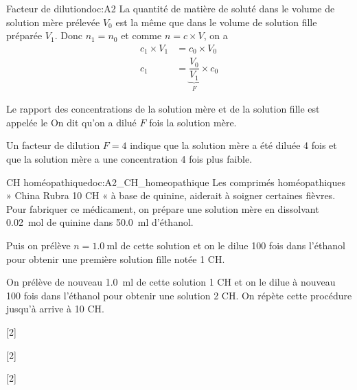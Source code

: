 \begin{doc}{Facteur de dilution}{doc:A2}
  La quantité de matière de soluté dans le volume de solution mère prélevée $V_0$ est la même que dans le volume de solution fille préparée $V_1$. Donc $n_1 = n_0$ et comme $n = c \times V$, on a
  \begin{align*}
    c_1 \times V_1 &= c_0 \times V_0 \\
    c_1 &= \underbrace{\dfrac{V_0}{V_1}}_{F} \times c_0
  \end{align*}

  \begin{importants}  
    Le rapport des concentrations de la solution mère et de la solution fille est appelée le 
    On dit qu'on a dilué $F$ fois la solution mère.
  \end{importants}
  \exemple Un facteur de dilution $F = 4$ indique que la solution mère a été diluée 4 fois et que la solution mère a une concentration 4 fois plus faible.
\end{doc}

\begin{doc}{CH homéopathique}{doc:A2_CH_homeopathique}
  Les comprimés homéopathiques » China Rubra 10 CH « à base de quinine, aiderait à soigner certaines fièvres.
  Pour fabriquer ce médicament, on prépare une solution mère en dissolvant \qty{0,02}{\mole} de quinine %
  dans \qty{50,0}{\ml} d’éthanol.
  
  Puis on prélève $n = \qty{1,0}{\ml}$ de cette solution et on le dilue 100 fois dans l’éthanol pour obtenir une première solution fille notée 1 CH.
  
  On prélève de nouveau \qty{1,0}{\ml} de cette solution 1 CH et on le dilue à nouveau 100 fois dans l'éthanol pour obtenir une solution 2 CH.
  On répète cette procédure jusqu'à arrive à 10 CH.
\end{doc}

[2]

[2]

[2]
